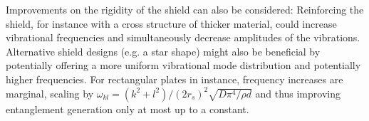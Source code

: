 Improvements on the rigidity of the shield can also be considered:
Reinforcing the shield, for instance with a cross structure of thicker material, could increase vibrational frequencies and simultaneously decrease amplitudes of the vibrations.
Alternative shield designs (e.g. a star shape) might also be beneficial by potentially offering a more uniform vibrational mode distribution and potentially higher frequencies. 
For rectangular plates in instance, frequency increases are marginal, scaling by $\omega_{kl} = (k^2 + l^2)/(2r_s)^2 \sqrt{D \pi^4 / \rho d}$ \cite[p. 471-474]{Rao_2019} and thus improving entanglement generation only at most up to a constant.